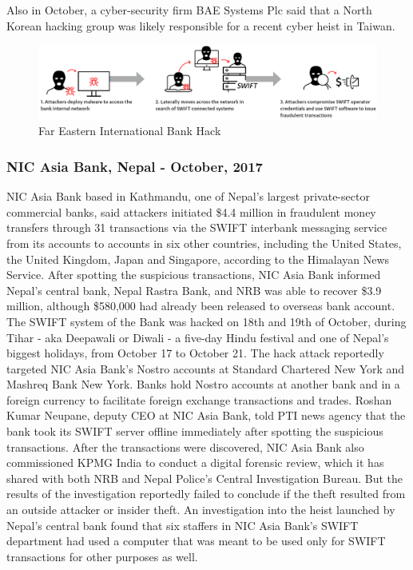 \documentclass[12pt]{article}
\begin{document}
        Also in October, a cyber-security firm BAE Systems Plc said that a North Korean hacking group was likely responsible for a recent cyber heist in Taiwan.\cite{intelligenceBAESystemsThreat}
        
        \begin{figure}[H]
        \centering
        \includegraphics[width=\textwidth]{figures/fareast.png}
        \caption{Far Eastern International Bank Hack}
        \label{fig:FarEastHacks}
        \end{figure}
        
    \subsubsection{NIC Asia Bank, Nepal - October, 2017}
        NIC Asia Bank based in Kathmandu, one of Nepal's largest private-sector commercial banks, said attackers initiated \$4.4 million in fraudulent money transfers through 31 transactions \cite{NICreport} via the SWIFT interbank messaging service from its accounts to accounts in six other countries, including the United States, the United Kingdom, Japan and Singapore, according to the Himalayan News Service. 
        After spotting the suspicious transactions, NIC Asia Bank informed Nepal's central bank, Nepal Rastra Bank, and NRB was able to recover \$3.9 million, although \$580,000 had already been released to overseas bank account.
        The SWIFT system of the Bank was hacked on 18th and 19th of October, during Tihar - aka Deepawali or Diwali - a five-day Hindu festival and one of Nepal's biggest holidays, from October 17 to October 21.
        The hack attack reportedly targeted NIC Asia Bank's Nostro accounts at Standard Chartered New York and Mashreq Bank New York. Banks hold Nostro accounts at another bank and in a foreign currency to facilitate foreign exchange transactions and trades.
        Roshan Kumar Neupane, deputy CEO at NIC Asia Bank, told PTI news agency that the bank took its SWIFT server offline immediately after spotting the suspicious transactions. After the transactions were discovered, NIC Asia Bank also commissioned KPMG India to conduct a digital forensic review, which it has shared with both NRB and Nepal Police's Central Investigation Bureau. But the results of the investigation reportedly failed to conclude if the theft resulted from an outside attacker or insider theft.
        An investigation into the heist launched by Nepal's central bank found that six staffers in NIC Asia Bank's SWIFT department had used a computer that was meant to be used only for SWIFT transactions for other purposes as well.\cite{ReportAttackersHacked}\cite{NICAsiaBank2017}
        
\end{document}
